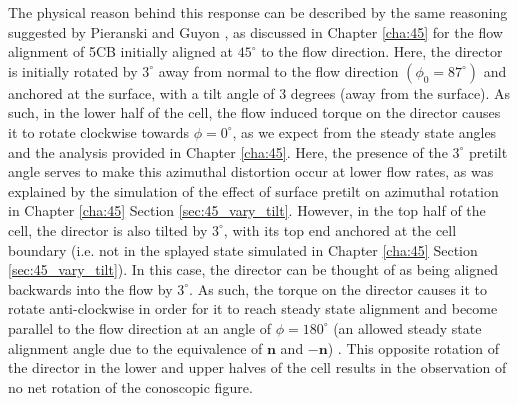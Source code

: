 The physical reason behind this response can be described by the same reasoning suggested by Pieranski and Guyon \cite{Pieranski1974}, as discussed in Chapter \ref{cha:45} for the flow alignment of 5CB initially aligned at $45^{\circ}$ to the flow direction. Here, the director is initially rotated by $3^{\circ}$ away from normal to the flow direction $\left(\phi_0=87^{\circ}\right)$ and anchored at the surface, with a tilt angle of 3 degrees (away from the surface). As such, in the lower half of the cell, the flow induced torque on the director causes it to rotate clockwise towards $\phi=0^{\circ}$, as we expect from the steady state angles and the analysis provided in Chapter \ref{cha:45}. Here, the presence of the $3^{\circ}$ pretilt angle serves to make this azimuthal distortion occur at lower flow rates, as was explained by the simulation of the effect of surface pretilt on azimuthal rotation in Chapter \ref{cha:45} Section \ref{sec:45_vary_tilt}. However, in the top half of the cell, the director is also tilted by $3^{\circ}$, with its top end anchored at the cell boundary (i.e. not in the splayed state simulated in Chapter \ref{cha:45} Section \ref{sec:45_vary_tilt}). In this case, the director can be thought of as being aligned backwards into the flow by $3^{\circ}$. As such, the torque on the director causes it to rotate anti-clockwise in order for it to reach steady state alignment and become parallel to the flow direction at an angle of $\phi=180^{\circ}$ (an allowed steady state alignment angle due to the equivalence of $\mathbf{n}$ and $\mathbf{-n}$) \cite{Horn2003}. This opposite rotation of the director in the lower and upper halves of the cell results in the observation of no net rotation of the conoscopic figure.

